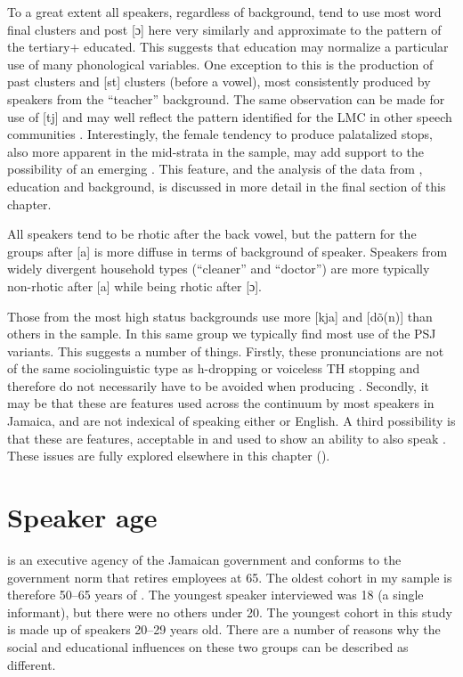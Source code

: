 To a great extent all speakers, regardless of background, tend to use most word final clusters and post [ɔ]  here very similarly and approximate to the pattern of the tertiary+ educated.  This suggests that education may normalize a particular use of many phonological variables.  One exception to this is the production of past clusters and [st] clusters (before a vowel), most consistently produced by speakers from the “teacher” background.  The same observation can be made for use of [tj] and may well reflect the pattern identified for the LMC in other speech communities \citep[126]{Labov1972}.  Interestingly, the female tendency to produce palatalized stops, also more apparent in the mid-strata in the sample, may add support to the possibility of an emerging .  This feature, and the analysis of the data from , education and background, is discussed in more detail in the final section of this chapter.  

  All speakers tend to be rhotic after the back vowel, but the pattern for the groups after [a] is more diffuse in terms of background of speaker.  Speakers from widely divergent household types (“cleaner” and “doctor”) are more typically non-rhotic after [a] while being rhotic after [ɔ].

Those from the most high status backgrounds use more [kja] and [dõ(n)] than others in the sample.  In this same group we typically find most use of the PSJ variants.  This suggests a number of things.  Firstly, these pronunciations are not of the same sociolinguistic type as h-dropping or voiceless TH stopping and therefore do not necessarily have to be avoided when producing .  Secondly, it may be that these are features used across the continuum by most speakers in Jamaica, and are not indexical of speaking either  or English.  A third possibility is that these are  features, acceptable in  and used to show an ability to also speak .  These issues are fully explored elsewhere in this chapter ().

\section{Speaker age}\label{sec:3.4}    

 is an executive agency of the Jamaican government and conforms to the government norm that retires employees at 65.  The oldest  cohort in my sample is therefore 50--65 years of .  The youngest speaker interviewed was 18 (a single informant), but there were no others under 20.  The youngest  cohort in this study is made up of speakers 20--29 years old.  There are a number of reasons why the social and educational influences on these two  groups can be described as different.

